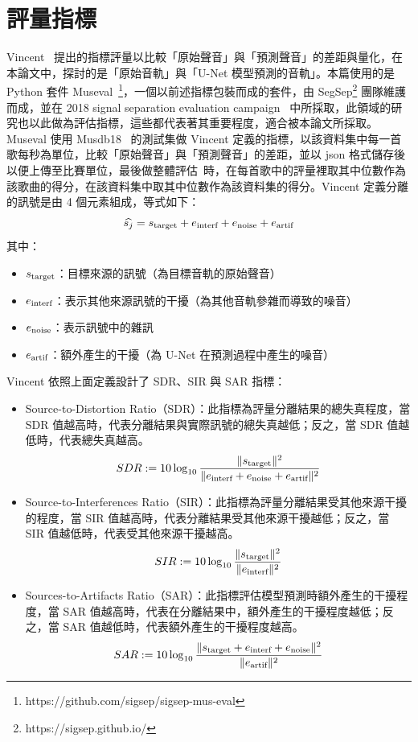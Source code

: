 \section{評量指標}
Vincent~\cite{vincent2006performance} 提出的指標評量以比較「原始聲音」與「預測聲音」的差距與量化，在本論文中，探討的是「原始音軌」與「U-Net 模型預測的音軌」。本篇使用的是 Python 套件 Museval~\cite{stoter2018museval}\footnote{https://github.com/sigsep/sigsep-mus-eval}，一個以前述指標包裝而成的套件，由 SegSep\footnote{https://sigsep.github.io/} 團隊維護而成，並在 2018 signal separation evaluation campaign~\cite{stoter20182018} 中所採取，此領域的研究也以此做為評估指標，這些都代表著其重要程度，適合被本論文所採取。Museval 使用 Musdb18~\cite{rafii2017musdb18,musdb18} 的測試集做 Vincent 定義的指標，以該資料集中每一首歌每秒為單位，比較「原始聲音」與「預測聲音」的差距，並以 json 格式儲存後以便上傳至比賽單位，最後做整體評估~\cite{stoter20182018}時，在每首歌中的評量裡取其中位數作為該歌曲的得分，在該資料集中取其中位數作為該資料集的得分。Vincent 定義分離的訊號是由 4 個元素組成，等式如下：
\begin{equation*}
    \widehat{s_j}=s_\textup{target}+e_\textup{interf}+e_\textup{noise}+e_\textup{artif}
\end{equation*}
其中：
\begin{itemize}
    \item $s_\textup{target}$：目標來源的訊號（為目標音軌的原始聲音）
    \item $e_\textup{interf}$：表示其他來源訊號的干擾（為其他音軌參雜而導致的噪音）
    \item $e_\textup{noise}$：表示訊號中的雜訊
    \item $e_\textup{artif}$：額外產生的干擾（為 U-Net 在預測過程中產生的噪音）
\end{itemize}
Vincent 依照上面定義設計了 SDR、SIR 與 SAR 指標：
\begin{itemize}
    \item Source-to-Distortion Ratio（SDR）：此指標為評量分離結果的總失真程度，當 SDR 值越高時，代表分離結果與實際訊號的總失真越低；反之，當 SDR 值越低時，代表總失真越高。
        \begin{equation*}
        SDR:=10\log_{10}\frac{\|s_\textup{target}\|^2}{\|e_\textup{interf}+e_\textup{noise}+e_\textup{artif}\|^2}
        \end{equation*}
    \item Source-to-Interferences Ratio（SIR）：此指標為評量分離結果受其他來源干擾的程度，當 SIR 值越高時，代表分離結果受其他來源干擾越低；反之，當 SIR 值越低時，代表受其他來源干擾越高。
        \begin{equation*}
        SIR:=10\log_{10}\frac{\|s_\textup{target}\|^2}{\|e_\textup{interf}\|^2}
        \end{equation*}
    \item Sources-to-Artifacts Ratio（SAR）：此指標評估模型預測時額外產生的干擾程度，當 SAR 值越高時，代表在分離結果中，額外產生的干擾程度越低；反之，當 SAR 值越低時，代表額外產生的干擾程度越高。
        \begin{equation*}
        SAR:=10\log_{10}\frac{\|s_\textup{target}+e_\textup{interf}+e_\textup{noise}\|^2}{\|e_\textup{artif}\|^2}
        \end{equation*}
\end{itemize}
